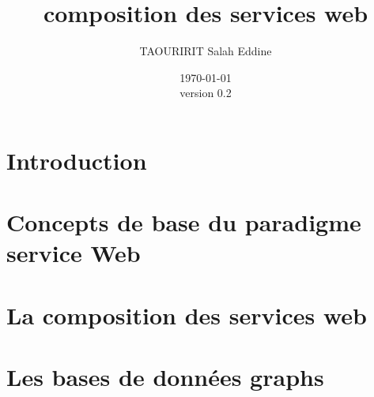 \documentclass[a4paper, oneside, 12pt]{report}
\author{TAOURIRIT Salah Eddine}
\title{composition des services web}
\date{\today\\version 0.2}
\begin{document}
\let\Item\item
\newcommand\SpecialItem{\renewcommand\item[1][]{\Item[\textbullet~\sffamily ##1]}}
\renewcommand\enddescription{\endlist\global\let\item\Item}

\renewcommand{\descriptionlabel}[1]{\hspace{1cm}\textsf{#1}} 

\maketitle 
\setcounter{secnumdepth}{4}
\setcounter{tocdepth}{4}
\tableofcontents
{}  


\chapter{Introduction}

\chapter{Concepts de base du paradigme service Web} 

\chapter{La composition des services web}
\chapter{Les bases de données graphs}




\printglossaries
\listoffigures
\listoftables
\end{document}
